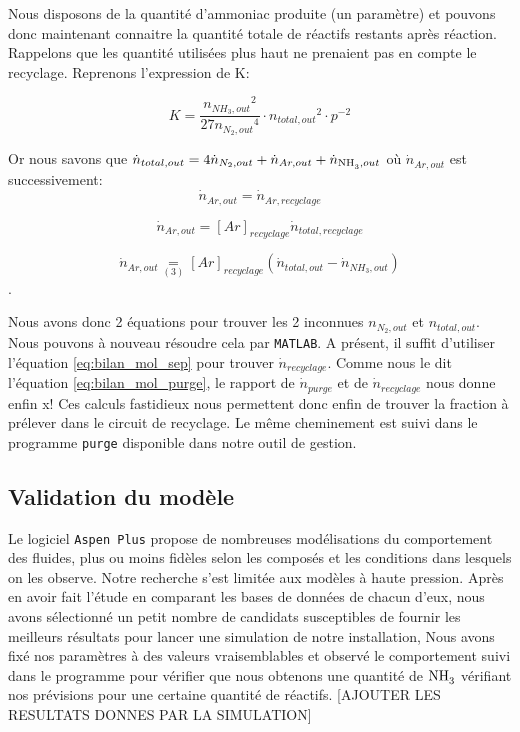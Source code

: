 \documentclass[a4paper, oneside, 12pt]{article}
\begin{document}
Nous disposons de la quantité d'ammoniac produite (un paramètre) 
et pouvons donc maintenant connaitre la quantité totale de réactifs restants après réaction. 
Rappelons que les quantité utilisées plus haut ne prenaient pas en compte le recyclage. 
Reprenons l'expression de K: 

\[ K=\frac{{n_{NH_3,out}}^2}{27{n_{N_2,out}}^4}\cdot {n_{total,out}}^2\cdot p^{-2} \]

Or nous savons que $\dot{n}_{total,out}=4\dot{n}_{N_2,out}+\dot{n}_{Ar,out}+\dot{n}_{\ce{NH3},out}$ 
où $\dot{n}_{Ar,out}$ est successivement:
\[\dot{n}_{Ar,out}=\dot{n}_{Ar,recyclage}\]

\[ \dot{n}_{Ar,out}=[Ar]_{recyclage}\dot{n}_{total,recyclage} \]

\[ \dot{n}_{Ar,out}\underset{(3)}=[Ar]_{recyclage}(\dot{n}_{total,out}-\dot{n}_{NH_3,out}) \].

Nous avons donc 2 équations pour trouver les 2 inconnues $n_{N_2,out}$ et $n_{total,out}$. 
Nous pouvons à nouveau résoudre cela par \texttt{MATLAB}. 
A présent, il suffit d'utiliser l'équation \ref{eq:bilan_mol_sep} pour trouver $\dot{n}_{recyclage}$. 
Comme nous le dit l'équation \ref{eq:bilan_mol_purge}, le rapport de $\dot{n}_{purge}$ 
et de $\dot{n}_{recyclage}$ nous donne enfin x! 
Ces calculs fastidieux nous permettent donc enfin de trouver la fraction à prélever 
dans le circuit de recyclage. 
Le même cheminement est suivi dans le programme \texttt{purge} disponible dans notre outil de gestion.

\subsection{Validation du modèle}

Le logiciel \texttt{Aspen Plus} propose de nombreuses modélisations du comportement des fluides, 
plus ou moins fidèles selon les composés et les conditions dans lesquels on les observe. 
Notre recherche s'est limitée aux modèles à haute pression. 
Après en avoir fait l'étude en comparant les bases de données de chacun d'eux, nous avons sélectionné un petit nombre de candidats susceptibles de fournir les meilleurs résultats pour lancer une simulation de notre installation, 
Nous avons fixé nos paramètres à des valeurs vraisemblables et observé le comportement suivi dans le programme pour vérifier que nous obtenons une quantité de $\ce{NH3}$ vérifiant nos prévisions pour une certaine quantité de réactifs. 
[AJOUTER LES RESULTATS DONNES PAR LA SIMULATION]

\printbibliography
\end{document}
